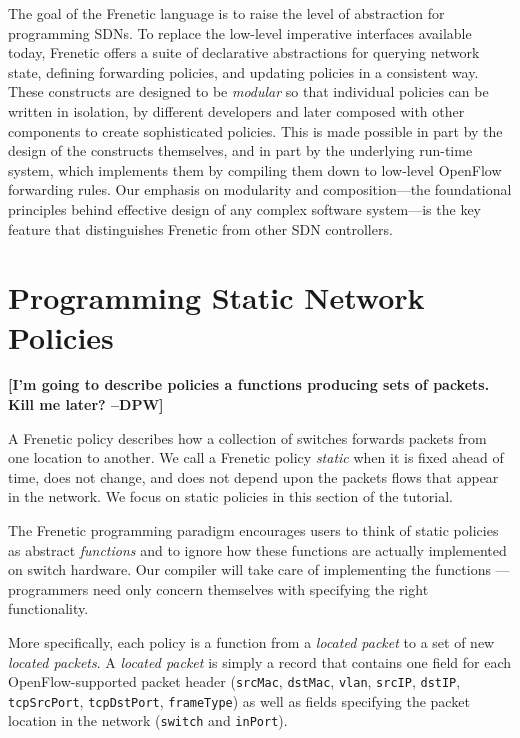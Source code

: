 \documentclass{article}
\newcommand{\finish}[2][cornellred]{\ifdraft\textcolor{#1}{\textbf{[#2]}}\fi}
\newcommand{\dpw}[1]{\finish[cornellred]{#1 --DPW}}
\newcommand{\code}[1]{\texttt{#1}}
\begin{document}
The goal of the Frenetic language is to raise the level of abstraction
for programming SDNs. To replace the low-level imperative interfaces
available today, Frenetic offers a suite of declarative abstractions
for querying network state, deﬁning forwarding policies, and updating
policies in a consistent way.  These constructs are designed to be
\emph{modular} so that individual policies can be written in isolation, by
different developers and later composed with other components to
create sophisticated policies. This is made possible in part by the
design of the constructs themselves, and in part by the underlying
run-time system, which implements them by compiling them down to
low-level OpenFlow forwarding rules.  Our emphasis on modularity and
composition—the foundational principles behind effective design of any
complex software system—is the key feature that distinguishes Frenetic
from other SDN controllers.

\section{Programming Static Network Policies}

\dpw{I'm going to describe policies a functions producing sets of packets.
Kill me later?}

A Frenetic policy describes how a collection of switches
forwards packets from one location to another.  We call a Frenetic policy
\emph{static} when it is fixed ahead of time,
does not change, and does not depend upon the packets flows that
appear in the network.  We focus on static policies in this
section of the tutorial.

The Frenetic programming paradigm encourages users to think of static
policies as abstract \emph{functions} and to ignore how these functions
are actually implemented on switch hardware.  Our compiler will take
care of implementing the functions --- programmers need only concern
themselves with specifying the right functionality.  

More specifically, each policy is a function
from a \emph{located packet} to a set of new \emph{located packets}.
A \emph{located packet} is simply a record that contains one
field for each OpenFlow-supported packet header (\code{srcMac}, \code{dstMac},
\code{vlan}, \code{srcIP}, \code{dstIP}, \code{tcpSrcPort}, \code{tcpDstPort}, 
\code{frameType}) as well as fields specifying the packet location 
in the network (\code{switch} and \code{inPort}).
\end{document}
